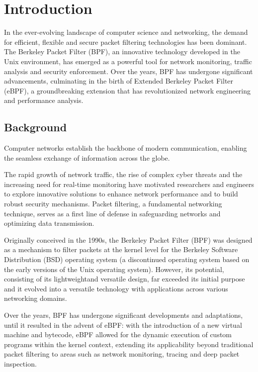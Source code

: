 \chapter{Introduction}

In the ever-evolving landscape of computer science and networking, the demand for efficient, flexible and secure packet filtering technologies has been dominant. 
The Berkeley Packet Filter (BPF), an innovative technology developed in the Unix environment, has emerged as a powerful tool for network monitoring, traffic analysis and security enforcement. 
Over the years, BPF has undergone significant advancements, culminating in the birth of Extended Berkeley Packet Filter (eBPF), a groundbreaking extension that has revolutionized network engineering and performance analysis.

\section{Background}

Computer networks establish the backbone of modern communication, enabling the seamless exchange of information across the globe. 

The rapid growth of network traffic, the rise of complex cyber threats and the increasing need for real-time monitoring have motivated researchers and engineers to explore innovative solutions to enhance network performance and to build robust security mechanisms.
Packet filtering, a fundamental networking technique, serves as a first line of defense in safeguarding networks and optimizing data transmission.

Originally conceived in the 1990s, the Berkeley Packet Filter (BPF) was designed as a mechanism to filter packets at the kernel level for the Berkeley Software Distribution (BSD) operating system (a discontinued operating system based on the early versions of the Unix operating system). 
However, its potential, consisting of its lightweightand versatile design, far exceeded its initial purpose and it evolved into a versatile technology with applications across various networking domains.

Over the years, BPF has undergone significant developments and adaptations, until it resulted in the advent of eBPF: with the introduction of a new virtual machine and bytecode, eBPF allowed for the dynamic execution of custom programs within the kernel context, extending its applicability beyond traditional packet filtering to areas such as network monitoring, tracing and deep packet inspection.

